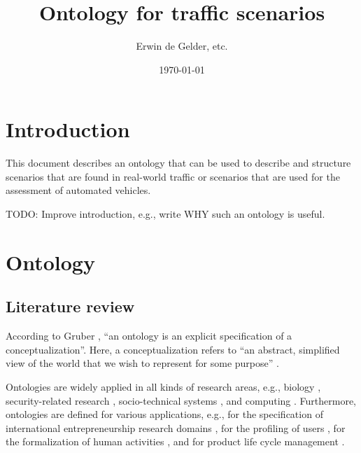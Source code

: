 \documentclass[10pt,final,a4paper,oneside,onecolumn]{article}
\def\reptitle{Ontology for traffic scenarios}
\def\repauthor{Erwin de Gelder, etc.}
\theoremstyle{plain}\newtheorem{definition}{Definition}[section]    %
\theoremstyle{definition}\newtheorem{example}{Example}[section]     %
\theoremstyle{remark}\newtheorem{remarkenv}{Remark}[section]        %
\begin{document}

\title{\textbf{\reptitle}}
\author{\repauthor}
\date{\today}
\maketitle

\tableofcontents

\newpage

\section{Introduction}
\label{sec:introduction}

This document describes an ontology that can be used to describe and structure scenarios that are found in real-world traffic or scenarios that are used for the assessment of automated vehicles.

\color{red}
TODO: Improve introduction, e.g., write WHY such an ontology is useful.
\color{black}

\section{Ontology}
\label{sec:ontology}

\subsection{Literature review}
\label{sec:ontology literature}

According to Gruber \cite{gruber1993ontology}, ``an ontology is an explicit specification of a conceptualization''. Here, a conceptualization refers to ``an abstract, simplified view of the world that we wish to represent for some purpose'' \cite{gruber1993ontology}. 

Ontologies are widely applied in all kinds of research areas, e.g., biology \cite{gkoutos2004mouse}, security-related research \cite{kim2005security}, socio-technical systems \cite{vanDamPhDThesis2009}, and computing \cite{chen2004soupa,chen2003ontology}. Furthermore, ontologies are defined for various applications, e.g., for the specification of international entrepreneurship research domains \cite{jones2011international}, for the profiling of users \cite{golemati2007creating}, for the formalization of human activities \cite{lee2017location}, and for product life cycle management \cite{matsokis2010plm}.

\end{document}
